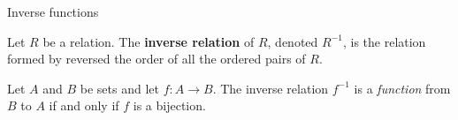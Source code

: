 \documentclass[10pt]{beamer}
\begin{document}
\begin{frame}[standout]
Inverse functions
\end{frame}


\begin{frame}

\footnotesize 
\begin{mygreenbox}[title=Definition (Scheinerman Def. 14.4)]
Let $R$ be a relation.  The \textbf{inverse relation} of $R$, denoted $R^{-1}$, is the relation formed by reversed the order of all the ordered pairs of $R$.
\end{mygreenbox}
 
\vfill 

\begin{myredbox}[title=Theorem (Scheinerman Thm 24.21)]
Let $A$ and $B$ be sets and let $f: A \to B$.   The inverse relation $f^{-1}$ is a \textit{function} from $B$ to $A$ if and only if $f$ is a bijection.
	
\end{myredbox}
\vfill 


\end{frame}
\end{document}
